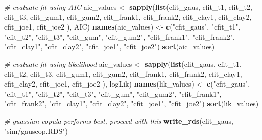 \documentclass[12pt, twoside]{amherstthesis}
\newenvironment{Shaded}{\begin{snugshade}}{\end{snugshade}}
\newcommand{\CommentTok}[1]{\textcolor[rgb]{0.56,0.35,0.01}{\textit{#1}}}
\newcommand{\FunctionTok}[1]{\textcolor[rgb]{0.13,0.29,0.53}{\textbf{#1}}}
\newcommand{\NormalTok}[1]{#1}
\newcommand{\OtherTok}[1]{\textcolor[rgb]{0.56,0.35,0.01}{#1}}
\newcommand{\StringTok}[1]{\textcolor[rgb]{0.31,0.60,0.02}{#1}}
\begin{document}
\begin{Shaded}
\begin{Highlighting}[]
\CommentTok{\# evaluate fit using AIC}
\NormalTok{aic\_values }\OtherTok{\textless{}{-}} \FunctionTok{sapply}\NormalTok{(}\FunctionTok{list}\NormalTok{(cfit\_gaus, cfit\_t1, cfit\_t2, cfit\_t3, }
\NormalTok{                          cfit\_gum1, cfit\_gum2, cfit\_frank1, cfit\_frank2, }
\NormalTok{                          cfit\_clay1, cfit\_clay2, cfit\_joe1, cfit\_joe2}
\NormalTok{                          ), AIC)}
\FunctionTok{names}\NormalTok{(aic\_values) }\OtherTok{\textless{}{-}} \FunctionTok{c}\NormalTok{(}\StringTok{"cfit\_gaus"}\NormalTok{, }\StringTok{"cfit\_t1"}\NormalTok{, }\StringTok{"cfit\_t2"}\NormalTok{, }\StringTok{"cfit\_t3"}\NormalTok{,}
                       \StringTok{"cfit\_gum"}\NormalTok{, }\StringTok{"cfit\_gum2"}\NormalTok{, }\StringTok{"cfit\_frank1"}\NormalTok{, }\StringTok{"cfit\_frank2"}\NormalTok{, }
                       \StringTok{"cfit\_clay1"}\NormalTok{, }\StringTok{"cfit\_clay2"}\NormalTok{, }\StringTok{"cfit\_joe1"}\NormalTok{, }\StringTok{"cfit\_joe2"}\NormalTok{)}
\FunctionTok{sort}\NormalTok{(aic\_values)}

\CommentTok{\# evaluate fit using likelihood}
\NormalTok{aic\_values }\OtherTok{\textless{}{-}} \FunctionTok{sapply}\NormalTok{(}\FunctionTok{list}\NormalTok{(cfit\_gaus, cfit\_t1, cfit\_t2, cfit\_t3, }
\NormalTok{                          cfit\_gum1, cfit\_gum2, cfit\_frank1, cfit\_frank2, }
\NormalTok{                          cfit\_clay1, cfit\_clay2, cfit\_joe1, cfit\_joe2}
\NormalTok{                          ), logLik)}
\FunctionTok{names}\NormalTok{(lik\_values) }\OtherTok{\textless{}{-}} \FunctionTok{c}\NormalTok{(}\StringTok{"cfit\_gaus"}\NormalTok{, }\StringTok{"cfit\_t1"}\NormalTok{, }\StringTok{"cfit\_t2"}\NormalTok{, }\StringTok{"cfit\_t3"}\NormalTok{,}
                       \StringTok{"cfit\_gum"}\NormalTok{, }\StringTok{"cfit\_gum2"}\NormalTok{, }\StringTok{"cfit\_frank1"}\NormalTok{, }\StringTok{"cfit\_frank2"}\NormalTok{, }
                       \StringTok{"cfit\_clay1"}\NormalTok{, }\StringTok{"cfit\_clay2"}\NormalTok{, }\StringTok{"cfit\_joe1"}\NormalTok{, }\StringTok{"cfit\_joe2"}\NormalTok{)}
\FunctionTok{sort}\NormalTok{(lik\_values)}

\CommentTok{\# guassian copula performs best, proceed with this}
\FunctionTok{write\_rds}\NormalTok{(cfit\_gaus, }\StringTok{"sim/gauscop.RDS"}\NormalTok{)}
\end{Highlighting}
\end{Shaded}
\end{document}
